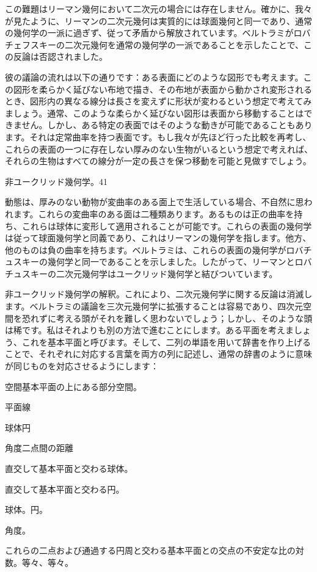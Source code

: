 \documentclass[a4paper,11pt,openany]{ltjsbook}
\begin{document}
この難題はリーマン幾何において二次元の場合には存在しません。確かに、我々が見たように、リーマンの二次元幾何は実質的には球面幾何と同一であり、通常の幾何学の一派に過ぎず、従って矛盾から解放されています。ベルトラミがロバチェフスキーの二次元幾何を通常の幾何学の一派であることを示したことで、この反論は否認されました。

彼の議論の流れは以下の通りです：ある表面にどのような図形でも考えます。この図形を柔らかく延びない布地で描き、その布地が表面から動かされ変形されるとき、図形内の異なる線分は長さを変えずに形状が変わるという想定で考えてみましょう。通常、このような柔らかく延びない図形は表面から移動することはできません。しかし、ある特定の表面ではそのような動きが可能であることもあります。それは定常曲率を持つ表面です。もし我々が先ほど行った比較を再考し、これらの表面の一つに存在しない厚みのない生物がいるという想定で考えれば、それらの生物はすべての線分が一定の長さを保つ移動を可能と見做すでしょう。

非ユークリッド幾何学。41


動態は、厚みのない動物が変曲率のある面上で生活している場合、不自然に思われます。これらの変曲率のある面は二種類あります。あるものは正の曲率を持ち、これらは球体に変形して適用されることが可能です。これらの表面の幾何学は従って球面幾何学と同義であり、これはリーマンの幾何学を指します。他方、他のものは負の曲率を持ちます。ベルトラミは、これらの表面の幾何学がロバチュスキーの幾何学と同一であることを示しました。したがって、リーマンとロバチュスキーの二次元幾何学はユークリッド幾何学と結びついています。

非ユークリッド幾何学の解釈。これにより、二次元幾何学に関する反論は消滅します。ベルトラミの議論を三次元幾何学に拡張することは容易であり、四次元空間を恐れずに考える頭がそれを難しく思わないでしょう；しかし、そのような頭は稀です。私はそれよりも別の方法で進むことにします。ある平面を考えましょう、これを基本平面と呼びます。そして、二列の単語を用いて辞書を作り上げることで、それぞれに対応する言葉を両方の列に記述し、通常の辞書のように意味が同じものを対応させるようにします：

空間基本平面の上にある部分空間。

平面線

球体円

角度二点間の距離

直交して基本平面と交わる球体。

直交して基本平面と交わる円。

球体。円。

角度。

これらの二点および通過する円周と交わる基本平面との交点の不安定な比の対数。等々、等々。
\end{document}
